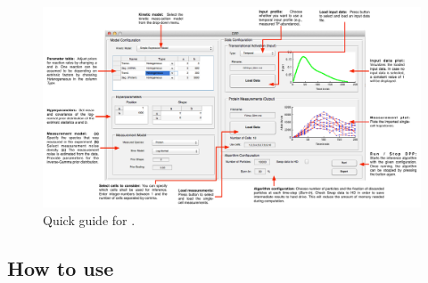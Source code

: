 \documentclass[a4paper, 9pt]{scrartcl}
\begin{document}
\begin{figure}[htbp]
\begin{center}
	\includegraphics[width=0.999\textwidth]{figures/Doc_QuickstartGUI}
\caption{Quick guide for \GuiDPP.}
\label{fig:QuickGuide}
\end{center}
\end{figure}

\subsection{How to use \GuiDPP}
\label{sec:HowToGuiDPP}
\end{document}
